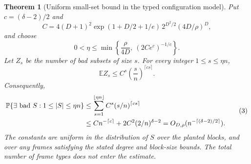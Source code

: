 \documentclass[11pt]{article}
\newtheorem{theorem}{Theorem}
\newcommand{\Prb}{\mathbb P}
\newcommand{\E}{\mathbb E}
\begin{document}
\begin{theorem}[Uniform small-set bound in the typed configuration model]
Put $c=(\delta-2)/2$ and
\[
 C=4(D+1)^2\exp(1+D/2+1/e)\,
       2^{D^2/2}(4D/\rho)^D,
\]
and choose
\[
 0<\eta\leq
 \min\left\{\frac{\rho}{4D},\ (2Ce^c)^{-1/c}\right\}.
 \tag{1}
\]
Let $Z_s$ be the number of bad subsets of size $s$. For every integer
$1\leq s\leq\eta n$,
\[
 \E Z_s\leq C^s\left(\frac{s}{n}\right)^{\lceil cs\rceil}.
 \tag{2}
\]
Consequently,
\[
 \begin{split}
 \Prb\{\exists\hbox{ bad }S:1\leq|S|\leq\eta n\}
 &\leq\sum_{s=1}^{\lfloor\eta n\rfloor}
             C^s(s/n)^{\lceil cs\rceil}\\
 &\leq Cn^{-\lceil c\rceil}
       +2C^2(2/n)^{\delta-2}
 =O_{D,\rho}(n^{-\lceil(\delta-2)/2\rceil}).
 \end{split}
 \tag{3}
\]
The constants are uniform in the distribution of $S$ over the planted
blocks, and over any frames satisfying the stated degree and block-size
bounds. The total number of frame types does not enter the estimate.
\end{theorem}
\end{document}

